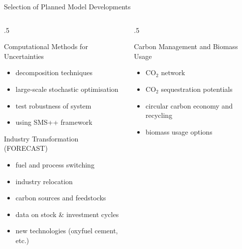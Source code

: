 \documentclass[10pt,aspectratio=169,dvipsnames]{beamer}
\begin{document}
\begin{frame}{Selection of Planned Model Developments}
  \begin{columns}[T] %
    \begin{column}{.5\textwidth}
        \begin{minipage}[t][.45\textheight]{\linewidth}
            \begin{alertblock}{Computational Methods for Uncertainties}
                \begin{itemize}
                  \item decomposition techniques
                  \item large-scale stochastic optimisation
                  \item test robustness of system
                  \item using SMS++ framework
                \end{itemize}
            \end{alertblock}
        \end{minipage}
        
        \vspace{0.03\textheight} %
        
        \begin{minipage}[t][.45\textheight]{\linewidth}
            \begin{alertblock}{Industry Transformation (FORECAST)}
              \begin{itemize}
                \item fuel and process switching
                \item industry relocation
                \item carbon sources and feedstocks
                \item data on stock \& investment cycles
                \item new technologies (oxyfuel cement, etc.)
              \end{itemize}
            \end{alertblock}
        \end{minipage}
    \end{column}
    
    \begin{column}{.5\textwidth}
        \begin{minipage}[t][.45\textheight]{\linewidth}
            \begin{alertblock}{Carbon Management and Biomass Usage}
              \begin{itemize}
                \item CO$_2$ network
                \item CO$_2$ sequestration potentials
                \item circular carbon economy and recycling
                \item biomass usage options
              \end{itemize}
            \end{alertblock}
        \end{minipage}
        

\end{column}
\end{columns}
\end{frame}
\end{document}

